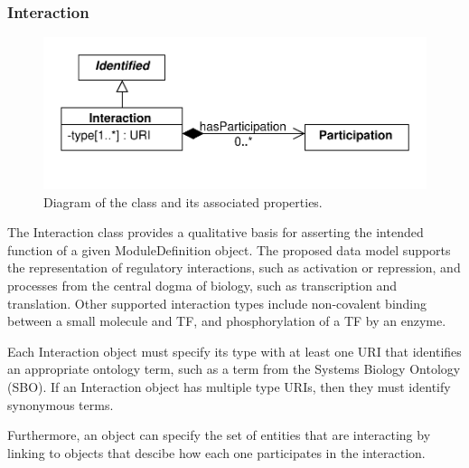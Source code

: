 \subsubsection{Interaction}
\label{sec:Interaction}

\begin{figure}[ht]
\begin{center}
\includegraphics[scale=0.6]{uml/interaction}
\caption[]{Diagram of the  class and its associated properties.}
\label{uml:interaction}
\end{center}
\end{figure}

The Interaction class provides a qualitative basis for asserting the intended function of a given ModuleDefinition object. The proposed data model supports the representation of regulatory interactions, such as activation or repression, and processes from the central dogma of biology, such as transcription and translation. Other supported interaction types include non-covalent binding between a small molecule and TF, and phosphorylation of a TF by an enzyme. 

Each Interaction object must specify its type with at least one URI that identifies an appropriate ontology term, such as a term from the Systems Biology Ontology (SBO). If an Interaction object has multiple type URIs, then they must identify synonymous terms. 


Furthermore, an object can specify the set of  entities that are interacting by linking to  objects that descibe how each one participates in the interaction.

